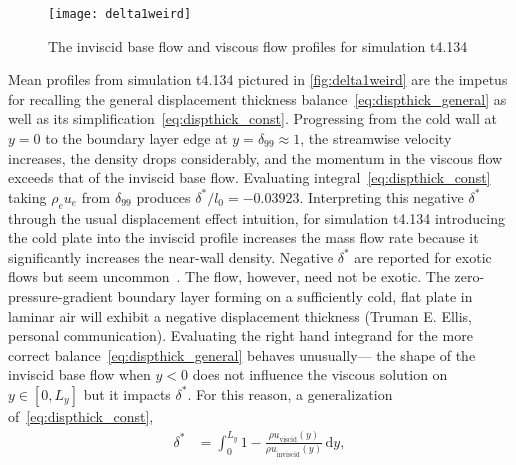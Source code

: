 \begin{figure}
\centering
\texttt{[image: delta1weird]}
\caption{%
    The inviscid base flow and viscous flow profiles for simulation
    t4.134\label{fig:delta1weird}
}
\end{figure}

Mean profiles from simulation t4.134 pictured in \autoref{fig:delta1weird} are
the impetus for recalling the general displacement thickness
balance~\eqref{eq:dispthick_general} as well as its
simplification~\eqref{eq:dispthick_const}.  Progressing from the cold wall at
$y=0$ to the boundary layer edge at $y=\delta_{99}\approx{}1$, the streamwise
velocity increases, the density drops considerably, and the momentum in the
viscous flow exceeds that of the inviscid base flow.
%
Evaluating integral~\eqref{eq:dispthick_const} taking $\rho_e u_e$ from
$\delta_{99}$ produces $\delta^\ast/l_0 = -0.03923$.
%
Interpreting this negative $\delta^\ast$ through the usual displacement effect
intuition, for simulation t4.134 introducing the cold plate into the inviscid
profile increases the mass flow rate because it significantly increases the
near-wall density.
%
Negative $\delta^\ast$ are reported for exotic flows but
seem uncommon~\citep[e.g.][]{Fergason2001Simulations, Brown1952Solutions}.
%
The flow, however, need not be exotic.  The zero-pressure-gradient boundary
layer forming on a sufficiently cold, flat plate in laminar air will exhibit a
negative displacement thickness (Truman E. Ellis, personal communication).
%
Evaluating the right hand integrand for the more correct
balance~\eqref{eq:dispthick_general} behaves unusually--- the shape of the inviscid base flow when $y < 0$ does not
influence the viscous solution on $y\in\left[0,L_y\right]$ but it
impacts $\delta^\ast$.
%
%
For this reason, a generalization of~\eqref{eq:dispthick_const},
\begin{align}
    \delta^\ast
&=
    \int_0^{L_y} 1 - \frac{{\rho u}_\text{viscid} (y)}
                          {{\rho u}_\text{inviscid} (y)} \, \mathrm{d}y,
    \label{eq:dispthick_final}
\end{align}
